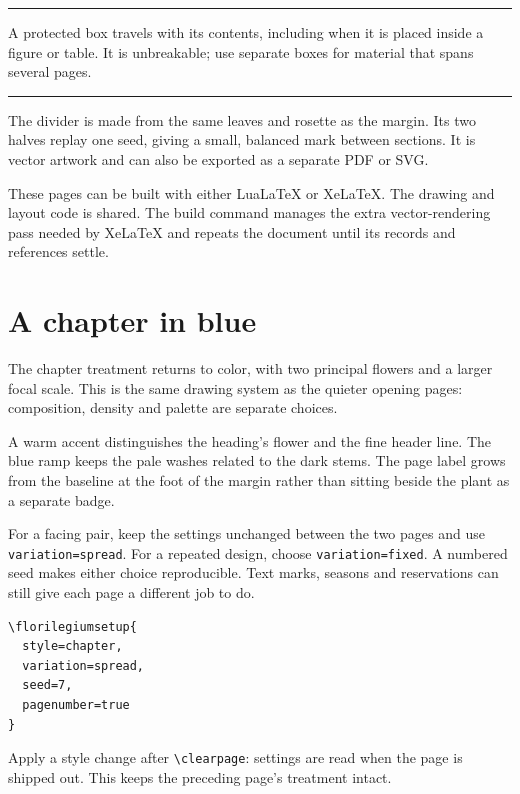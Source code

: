 \documentclass[11pt,a4paper,twoside]{article}
\begin{document}
\begin{florilegiumprotect}[3mm]
\hrule\smallskip
\small A protected box travels with its contents, including when it is placed
inside a figure or table. It is unbreakable; use separate boxes for material
that spans several pages.
\smallskip\hrule
\end{florilegiumprotect}

\florilegiumdivider[28mm]

The divider is made from the same leaves and rosette as the margin. Its two
halves replay one seed, giving a small, balanced mark between sections.
It is vector artwork and can also be exported as a separate PDF or SVG.

These pages can be built with either LuaLaTeX or XeLaTeX. The drawing and layout
code is shared. The build command manages the extra vector-rendering pass
needed by XeLaTeX and repeats the document until its records and references settle.
\clearpage

\setcounter{page}{38}
\section{A chapter in blue}
The chapter treatment returns to color, with two principal flowers and a larger
focal scale. This is the same drawing system as the quieter opening pages:
composition, density and palette are separate choices.

A warm accent distinguishes the heading's flower and the fine header line.
The blue ramp keeps the pale washes related to the dark stems. The page label
grows from the baseline at the foot of the margin rather than sitting beside
the plant as a separate badge.

\florilegiumdivider

For a facing pair, keep the settings unchanged between the two pages and use
\texttt{variation=spread}. For a repeated design, choose \texttt{variation=fixed}.
A numbered seed makes either choice reproducible. Text marks, seasons and
reservations can still give each page a different job to do.

\begin{verbatim}
\florilegiumsetup{
  style=chapter,
  variation=spread,
  seed=7,
  pagenumber=true
}
\end{verbatim}
Apply a style change after \verb|\clearpage|: settings are read when the page
is shipped out. This keeps the preceding page's treatment intact.
\clearpage
\end{document}

